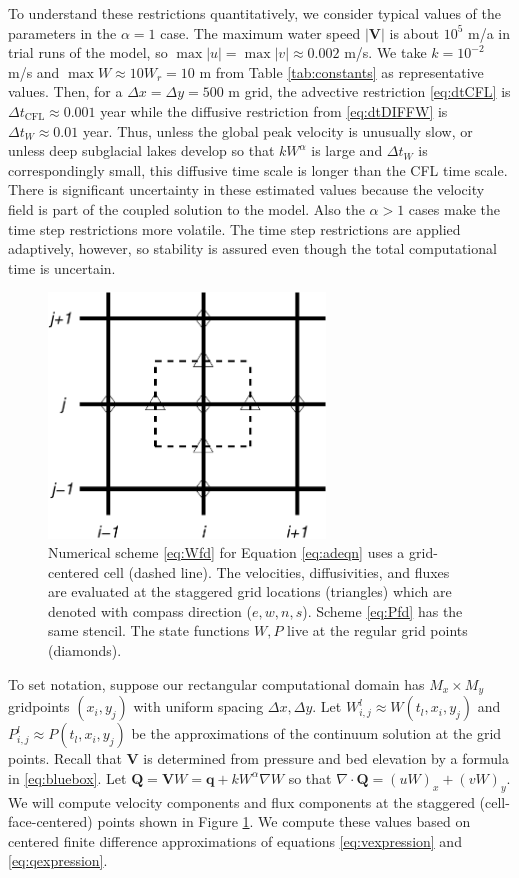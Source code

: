 \documentclass[11pt,final]{amsart}
\newcommand\bV{\mathbf{V}}
\newcommand\bq{\mathbf{q}}
\newcommand\bQ{\mathbf{Q}}
\newcommand{\Div}{\nabla\cdot}
\newcommand{\grad}{\nabla}
\newcommand{\Wlij}{W^l_{i,j}}
\newcommand{\Plij}{P^l_{i,j}}
\begin{document}
To understand these restrictions quantitatively, we consider typical values of the parameters in the $\alpha=1$ case.  The maximum water speed $|\bV|$ is about $10^5$ m/a in trial runs of the model, so $\max |u| = \max |v| \approx 0.002$ m/s.  We take $k=10^{-2}$ m/s and $\max W\approx 10 W_r=10$ m  from Table \ref{tab:constants} as representative values.  Then, for a $\Delta x = \Delta y = 500$ m grid, the advective restriction \eqref{eq:dtCFL} is $\Delta t_{\text{CFL}} \approx 0.001$ year while the diffusive restriction from \eqref{eq:dtDIFFW} is $\Delta t_W \approx 0.01$ year.  Thus, unless the global peak velocity is unusually slow, or unless deep subglacial lakes develop so that $k W^\alpha$ is large and $\Delta t_W$ is correspondingly small, this diffusive time scale is longer than the CFL time scale.  There is significant uncertainty in these estimated values because the velocity field is part of the coupled solution to the model.  Also the $\alpha > 1$ cases make the time step restrictions more volatile.  The time step restrictions are applied adaptively, however, so stability is assured even though the total computational time is uncertain.

\begin{figure}[ht]
\centering
\includegraphics[width=2.9in,keepaspectratio=true]{diffstencil}
\bigskip
\caption{Numerical scheme \eqref{eq:Wfd} for Equation \eqref{eq:adeqn} uses a grid-centered cell (dashed line).  The velocities, diffusivities, and fluxes are evaluated at the staggered grid locations (triangles) which are denoted with compass direction ($e,w,n,s$).  Scheme \eqref{eq:Pfd} has the same stencil.  The state functions $W,P$ live at the regular grid points (diamonds).}
\label{fig:stencil}
\end{figure}

To set notation, suppose our rectangular computational domain has $M_x \times M_y$ gridpoints $(x_i,y_j)$ with uniform spacing $\Delta x,\Delta y$.  Let $\Wlij \approx W(t_l,x_i,y_j)$ and $\Plij \approx P(t_l,x_i,y_j)$ be the approximations of the continuum solution at the grid points.  Recall that $\bV$ is determined from pressure and bed elevation by a formula in \eqref{eq:bluebox}.  Let $\bQ=\bV W = \bq + k W^\alpha \grad W$ so that $\Div \bQ = (u W)_x + (v W)_y$.  We will compute velocity components and flux components at the staggered (cell-face-centered) points shown in Figure \ref{fig:stencil}.  We compute these values based on centered finite difference approximations of equations \eqref{eq:vexpression} and \eqref{eq:qexpression}.
\end{document}
